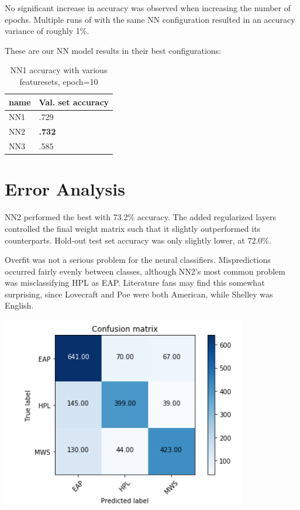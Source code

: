 \documentclass[8pt]{article}
\begin{document}
No significant increase in accuracy was observed when increasing the number of epochs. Multiple runs of with the same NN configuration resulted in an accuracy variance of roughly 1\%.

These are our NN model results in their best configurations:

\begin{table}[h]
  \centering
  \begin{tabular}{|l|l|}
    \hline
    name & Val. set accuracy \\
    \hline
    NN1      & .729 \\
    NN2      & \textbf{.732} \\
    NN3      & .585 \\
    \hline
  \end{tabular}
  \caption{NN1 accuracy with various featuresets, epoch=10}
  \label{tab:nn-results}
\end{table}



\section{Error Analysis}
NN2 performed the best with 73.2\% accuracy. The added regularized layers controlled the final weight matrix such that it slightly outperformed its counterparts. Hold-out test set accuracy was only slightly lower, at 72.0\%. 

Overfit was not a serious problem for the neural classifiers. Mispredictions occurred fairly evenly between classes, although NN2's most common problem was misclassifying HPL as EAP. Literature fans may find this somewhat surprising, since Lovecraft and Poe were both American, while Shelley was English.


\includegraphics[scale=.6, center]{images/conf_mat.png}
\end{document}
